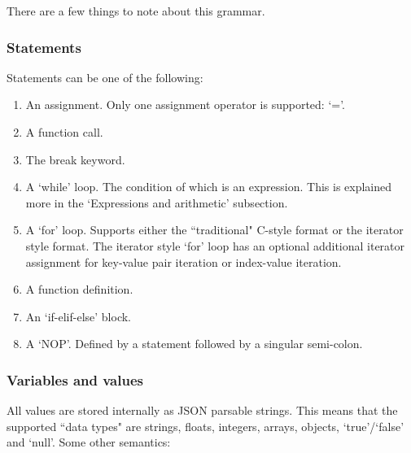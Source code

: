 \documentclass[12pt, letterpaper]{article}
\begin{document}
There are a few things to note about this grammar.

\subsubsection{Statements}

Statements can be one of the following:

\begin{center}
    \begin{enumerate}
        \item An assignment. Only one assignment operator is supported: `='.
        \item A function call.
        \item The break keyword.
        \item A `while' loop. The condition of which is an expression. This is explained more in the `Expressions and arithmetic' subsection.
        \item A `for' loop. Supports either the ``traditional" C-style format or the iterator style format. The iterator style `for' loop has an optional additional iterator assignment for key-value pair iteration or index-value iteration.
        \item A function definition.
        \item An `if-elif-else' block.
        \item A `NOP'. Defined by a statement followed by a singular semi-colon.
    \end{enumerate}
\end{center}

\subsubsection{Variables and values}

All values are stored internally as JSON parsable strings. This means that the supported ``data types" are strings, floats, integers, arrays, objects, `true'/`false' and `null'. Some other semantics:
\end{document}
